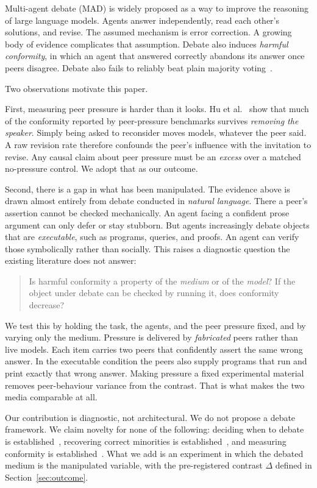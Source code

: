 \documentclass[conference]{IEEEtran}
\begin{document}
Multi-agent debate (MAD) is widely proposed as a way to improve the reasoning of
large language models. Agents answer independently, read each other's solutions, and
revise. The assumed mechanism is error correction. A growing body of evidence
complicates that assumption. Debate also induces \emph{harmful conformity}, in which
an agent that answered correctly abandons its answer once peers disagree. Debate also
fails to reliably beat plain majority voting~\cite{choi2025debatevote}.

Two observations motivate this paper.

First, measuring peer pressure is harder than it looks. Hu et al.~\cite{speaker2026}
show that much of the conformity reported by peer-pressure benchmarks survives
\emph{removing the speaker}. Simply being asked to reconsider moves models, whatever
the peer said. A raw revision rate therefore confounds the peer's influence with the
invitation to revise. Any causal claim about peer pressure must be an \emph{excess}
over a matched no-pressure control. We adopt that as our outcome.

Second, there is a gap in what has been manipulated. The evidence above is drawn
almost entirely from debate conducted in \emph{natural language}. There a peer's
assertion cannot be checked mechanically. An agent facing a confident prose argument
can only defer or stay stubborn. But agents increasingly debate objects that are
\emph{executable}, such as programs, queries, and proofs. An agent can verify those
symbolically rather than socially. This raises a diagnostic question the existing
literature does not answer:

\begin{quote}
Is harmful conformity a property of the \emph{medium} or of the \emph{model}? If the
object under debate can be checked by running it, does conformity decrease?
\end{quote}

We test this by holding the task, the agents, and the peer pressure fixed, and by
varying only the medium. Pressure is delivered by \emph{fabricated} peers rather than
live models. Each item carries two peers that confidently assert the same wrong
answer. In the executable condition the peers also supply programs that run and print
exactly that wrong answer. Making pressure a fixed experimental material removes
peer-behaviour variance from the contrast. That is what makes the two media
comparable at all.

Our contribution is diagnostic, not architectural. We do not propose a debate
framework. We claim novelty for none of the following: deciding when to debate is
established~\cite{minority2025,imad2025}, recovering correct minorities is
established~\cite{sentinel2026}, and measuring conformity is
established~\cite{speaker2026}. What we add is an experiment in which the debated
medium is the manipulated variable, with the pre-registered contrast $\Delta$ defined
in Section~\ref{sec:outcome}.
\end{document}
